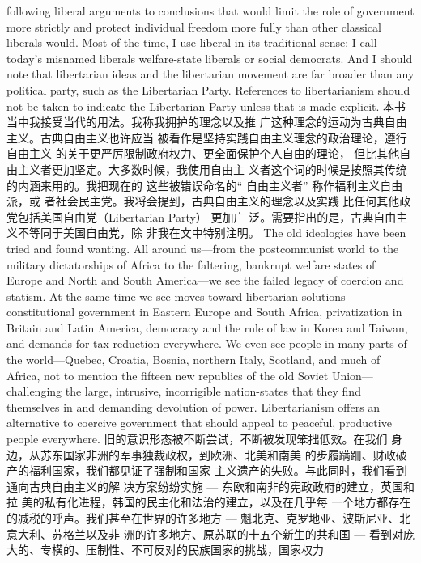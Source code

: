 \begin{paracol}{2}
following liberal arguments to conclusions that would limit the
role of government more strictly and protect individual freedom more fully than other classical liberals would. Most of the
time, I use liberal in its traditional sense; I call today's misnamed liberals welfare-state liberals or social democrats. And I
should note that libertarian ideas and the libertarian movement
are far broader than any political party, such as the Libertarian
Party. References to libertarianism should not be taken to indicate the Libertarian Party unless that is made explicit.
\switchcolumn
本书当中我接受当代的用法。我称我拥护的理念以及推
广这种理念的运动为古典自由主义。古典自由主义也许应当
被看作是坚持实践自由主义理念的政治理论，遵行自由主义
的关于更严厉限制政府权力、更全面保护个人自由的理论，
但比其他自由主义者更加坚定。大多数时候，我使用自由主
义者这个词的时候是按照其传统的内涵来用的。我把现在的
这些被错误命名的“ 自由主义者” 称作福利主义自由派，或
者社会民主党。我将会提到，古典自由主义的理念以及实践
比任何其他政党包括美国自由党（Libertarian Party） 更加广
泛。需要指出的是，古典自由主义不等同于美国自由党，除
非我在文中特别注明。
\switchcolumn*
The old ideologies have been tried and found wanting. All
around us---from the postcommunist world to the military dictatorships of Africa to the faltering, bankrupt welfare states of
Europe and North and South America---we see the failed
legacy of coercion and statism. At the same time we see moves
toward libertarian solutions---constitutional government in Eastern Europe and South Africa, privatization in Britain and
Latin America, democracy and the rule of law in Korea and Taiwan, and demands for tax reduction everywhere. We even see
people in many parts of the world---Quebec, Croatia, Bosnia,
northern Italy, Scotland, and much of Africa, not to mention
the fifteen new republics of the old Soviet Union---challenging
the large, intrusive, incorrigible nation-states that they find
themselves in and demanding devolution of power. Libertarianism offers an alternative to coercive government that should appeal to peaceful, productive people everywhere.
\switchcolumn
旧的意识形态被不断尝试，不断被发现笨拙低效。在我们
身边，从苏东国家非洲的军事独裁政权，到欧洲、北美和南美
的步履蹒跚、财政破产的福利国家，我们都见证了强制和国家
主义遗产的失败。与此同时，我们看到通向古典自由主义的解
决方案纷纷实施 --- 东欧和南非的宪政政府的建立，英国和拉
美的私有化进程，韩国的民主化和法治的建立，以及在几乎每
一个地方都存在的减税的呼声。我们甚至在世界的许多地方
--- 魁北克、克罗地亚、波斯尼亚、北意大利、苏格兰以及非
洲的许多地方、原苏联的十五个新生的共和国 --- 看到对庞大的、专横的、压制性、不可反对的民族国家的挑战，国家权力

\end{paracol}
